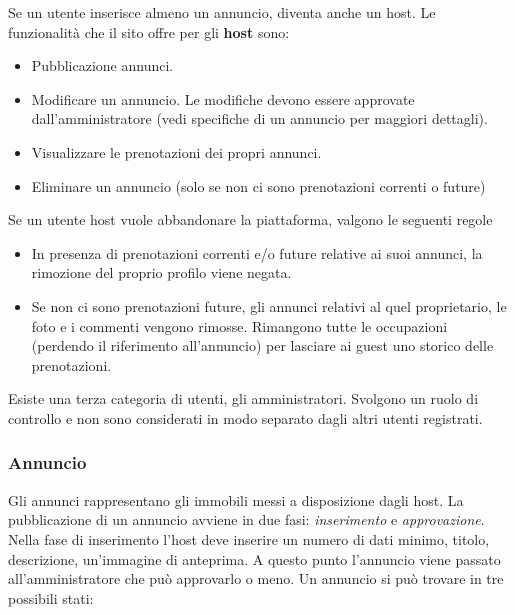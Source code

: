 \documentclass[1_relazione.tex]{subfiles}
\begin{document}
Se un utente inserisce almeno un annuncio, diventa anche un host. Le funzionalità che il sito offre per gli \textbf{host} sono: 
\begin{itemize}
\item Pubblicazione annunci.
\item Modificare un annuncio. Le modifiche devono essere approvate dall'amministratore (vedi specifiche di un annuncio per maggiori dettagli).
\item Visualizzare le prenotazioni dei propri annunci.
\item Eliminare un annuncio (solo se non ci sono prenotazioni correnti o future)
\end{itemize}




Se un utente host vuole abbandonare la piattaforma, valgono le seguenti regole 
\begin{itemize}
\item In presenza di prenotazioni correnti e/o future relative ai suoi annunci, la rimozione del proprio profilo viene negata.
\item Se non ci sono prenotazioni future, gli annunci relativi al quel proprietario, le foto e i commenti vengono rimosse. Rimangono tutte le occupazioni (perdendo il riferimento all'annuncio) per lasciare ai guest uno storico delle prenotazioni.
\end{itemize}

Esiste una terza categoria di utenti, gli amministratori. Svolgono un ruolo di controllo e non sono considerati in modo separato dagli altri utenti registrati.  \\

\subsubsection{Annuncio} 
Gli annunci rappresentano gli immobili messi a disposizione dagli host. La pubblicazione di un annuncio avviene in due fasi: \textit{inserimento} e \textit{approvazione}.
Nella fase di inserimento l'host deve inserire un numero di dati minimo, titolo, descrizione, un'immagine di anteprima. A questo punto l'annuncio viene passato all'amministratore che può approvarlo o meno. Un annuncio si può trovare in tre possibili stati: 
\end{document}
